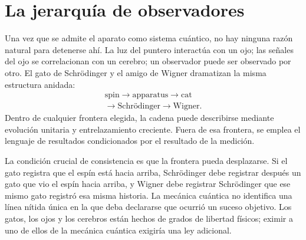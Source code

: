 \begin{classroomqa}
\end{classroomqa}

\begin{classroomqa}
\end{classroomqa}

\section{La jerarquía de observadores}

Una vez que se admite el aparato como sistema cuántico, no hay ninguna razón natural para detenerse ahí. La luz del puntero interactúa con un ojo; las señales del ojo se correlacionan con un cerebro; un observador puede ser observado por otro. El gato de Schr\"odinger y el amigo de Wigner dramatizan la misma estructura anidada:
\begin{equation}
\begin{gathered}
\text{spin}
\longrightarrow
\text{apparatus}
\longrightarrow
\text{cat}\\
\longrightarrow
\text{Schr\"odinger}
\longrightarrow
\text{Wigner}.
\end{gathered}
\label{eq:l7-observer-chain}
\end{equation}
Dentro de cualquier frontera elegida, la cadena puede describirse mediante evolución unitaria y entrelazamiento creciente. Fuera de esa frontera, se emplea el lenguaje de resultados condicionados por el resultado de la medición.

La condición crucial de consistencia es que la frontera pueda desplazarse. Si el gato registra que el espín está hacia arriba, Schr\"odinger debe registrar después un gato que vio el espín hacia arriba, y Wigner debe registrar Schr\"odinger que ese mismo gato registró esa misma historia. La mecánica cuántica no identifica una línea nítida única en la que deba declararse que ocurrió un suceso objetivo. Los gatos, los ojos y los cerebros están hechos de grados de libertad físicos; eximir a uno de ellos de la mecánica cuántica exigiría una ley adicional.

